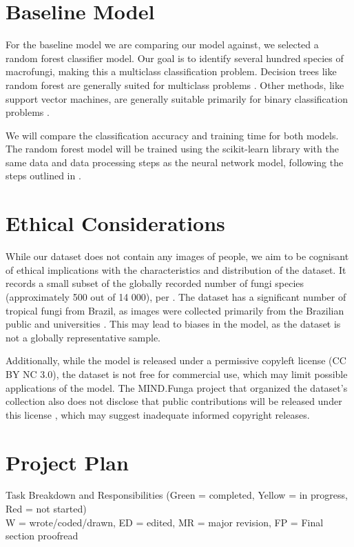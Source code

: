 \documentclass{article} %
\begin{document}
\section{Baseline Model}
\label{baseline}
For the baseline model we are comparing our model against, we selected a random forest classifier model. Our goal is to identify several hundred species of macrofungi, making this a multiclass classification problem. Decision trees like random forest are generally suited for multiclass problems \citep{GallRazaviEtAl.IntroductionRandomForests.2012}. Other methods, like support vector machines, are generally suitable primarily for binary classification problems \citep{JamesWittenEtAl.IntroductionStatisticalLearning.2023}. 

We will compare the classification accuracy and training time for both models. The random forest model will be trained using the scikit-learn library with the same data and data processing steps as the neural network model, following the steps outlined in \cite{Shafl.RandomForestClassification.2023}.

\section{Ethical Considerations}
While our dataset does not contain any images of people, we aim to be cognisant of ethical implications with the characteristics and distribution of the dataset. It records a small subset of the globally recorded number of fungi species (approximately 500 out of 14 000), per \cite{LuckingAimeEtAl.UnambiguousIdentificationFungi.2020}. The dataset has a significant number of tropical fungi from Brazil, as images were collected primarily from the Brazilian public and universities \citep{Drechsler-SantosKarstedtEtAl.MINDFunga.2023}. This may lead to biases in the model, as the dataset is not a globally representative sample.

Additionally, while the model is released under a permissive copyleft license (CC BY NC 3.0), the dataset is not free for commercial use, which may limit possible applications of the model. The MIND.Funga project that organized the dataset's collection also does not disclose that public contributions will be released under this license \citep{Drechsler-SantosKarstedtEtAl.MINDFunga.2023}, which may suggest inadequate informed copyright releases.

\section{Project Plan}
Task Breakdown and Responsibilities (Green = completed, Yellow = in progress, Red = not started)\\
W = wrote/coded/drawn, ED = edited, MR = major revision, FP = Final section proofread
\end{document}
